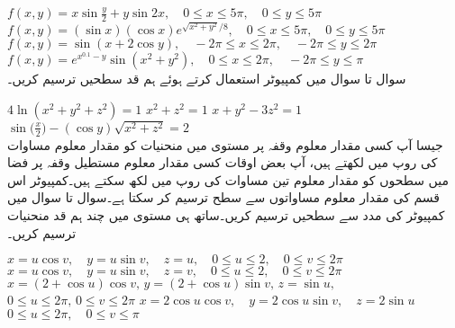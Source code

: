 $f(x,y)=x\sin\tfrac{y}{2}+y\sin 2x,\quad 0\le x\le 5\pi,\quad 0\le y\le 5\pi$
$f(x,y)=(\sin x)(\cos x)e^{\sqrt{x^2+y^2}/8},\quad 0\le x\le 5\pi,\quad 0\le y\le 5\pi$
$f(x,y)=\sin(x+2\cos y),\quad -2\pi\le x\le 2\pi,\quad -2\pi\le y\le 2\pi$
$f(x,y)=e^{x^{0.1}-y}\sin (x^2+y^2),\quad 0\le x\le 2\pi,\quad -2\pi\le y\le \pi$
\\
سوال  تا سوال  میں کمپیوٹر استعمال کرتے ہوئے ہم قد سطحیں  ترسیم کریں۔

$4\ln(x^2+y^2+z^2)=1$
$x^2+z^2=1$
$x+y^2-3z^2=1$
$\sin\big(\frac{x}{2}\big)-(\cos y)\sqrt{x^2+z^2}=2$
\\
جیسا آپ کسی مقدار معلوم وقفہ  پر  مستوی میں منحنیات کو مقدار معلوم مساوات  کی    روپ میں لکھتے ہیں، آپ بعض اوقات کسی مقدار معلوم مستطیل وقفہ  پر  فضا میں سطحوں کو    مقدار معلوم تین مساوات   کی روپ میں لکھ سکتے ہیں۔کمپیوٹر اس قسم کی مقدار معلوم مساواتوں سے سطح  ترسیم کر سکتا ہے۔سوال  تا سوال  میں کمپیوٹر کی مدد سے سطحیں ترسیم کریں۔ساتھ ہی  مستوی میں چند ہم قد منحنیات ترسیم کریں۔

$x=u\cos v,\quad y=u\sin v,\quad z=u,\quad 0\le u\le 2,\quad 0\le v\le 2\pi$
$x=u\cos v,\quad y=u\sin v,\quad z=v,\quad 0\le u\le 2,\quad 0\le v\le 2\pi$
$x=(2+\cos u)\cos v,\,y=(2+\cos u)\sin v,\, z=\sin u,$\\
$ 0\le u\le 2\pi,\, 0\le v\le 2\pi$
$x=2\cos u\cos v,\quad y=2\cos u\sin v,\quad z=2\sin u$\\
$0\le u\le 2\pi,\quad 0\le v\le \pi$
